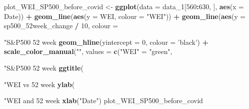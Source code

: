 \documentclass[]{article}
\newenvironment{Shaded}{\begin{snugshade}}{\end{snugshade}}
\newcommand{\KeywordTok}[1]{\textcolor[rgb]{0.13,0.29,0.53}{\textbf{#1}}}
\newcommand{\DataTypeTok}[1]{\textcolor[rgb]{0.13,0.29,0.53}{#1}}
\newcommand{\DecValTok}[1]{\textcolor[rgb]{0.00,0.00,0.81}{#1}}
\newcommand{\StringTok}[1]{\textcolor[rgb]{0.31,0.60,0.02}{#1}}
\newcommand{\OperatorTok}[1]{\textcolor[rgb]{0.81,0.36,0.00}{\textbf{#1}}}
\newcommand{\NormalTok}[1]{#1}
\begin{document}
\begin{Shaded}
\begin{Highlighting}[]
{{{{{{{{\NormalTok{plot_WEI_SP500_before_covid <-}\StringTok{ }\KeywordTok{ggplot}\NormalTok{(}\DataTypeTok{data =}\NormalTok{ data_}\DecValTok{1}\NormalTok{[}\DecValTok{560}\OperatorTok{:}\DecValTok{630}\NormalTok{, ], }\KeywordTok{aes}\NormalTok{(}\DataTypeTok{x =}\NormalTok{ Date)) }\OperatorTok{+}
\StringTok{  }\KeywordTok{geom_line}\NormalTok{(}\KeywordTok{aes}\NormalTok{(}\DataTypeTok{y =}\NormalTok{ WEI, }\DataTypeTok{colour =} \StringTok{"WEI"}\NormalTok{)) }\OperatorTok{+}\StringTok{ }
\StringTok{  }\KeywordTok{geom_line}\NormalTok{(}\KeywordTok{aes}\NormalTok{(}\DataTypeTok{y =}\NormalTok{ sp500_52week_change }\OperatorTok{/}\StringTok{ }\DecValTok{10}\NormalTok{, }\DataTypeTok{colour =} \StringTok{"S&P500 52 week %change"}\NormalTok{)) }\OperatorTok{+}
\StringTok{  }\KeywordTok{geom_hline}\NormalTok{(}\DataTypeTok{yintercept =} \DecValTok{0}\NormalTok{, }\DataTypeTok{colour =} \StringTok{'black'}\NormalTok{) }\OperatorTok{+}
\StringTok{  }\KeywordTok{scale_color_manual}\NormalTok{(}\StringTok{""}\NormalTok{, }\DataTypeTok{values =} \KeywordTok{c}\NormalTok{(}\StringTok{"WEI"}\NormalTok{ =}\StringTok{ "green"}\NormalTok{, }\StringTok{"S&P500 52 week %change"}\NormalTok{ =}\StringTok{ "blue"}\NormalTok{)) }\OperatorTok{+}\StringTok{ }
\StringTok{  }\KeywordTok{ggtitle}\NormalTok{(}\StringTok{"WEI vs 52 week % change of S&P500 before COVID-19"}\NormalTok{) }\OperatorTok{+}\StringTok{ }
\StringTok{  }\KeywordTok{ylab}\NormalTok{(}\StringTok{"WEI and 52 week % change S&P500"}\NormalTok{) }\OperatorTok{+}\StringTok{ }
\StringTok{  }\KeywordTok{xlab}\NormalTok{(}\StringTok{"Date"}\NormalTok{)}
\NormalTok{plot_WEI_SP500_before_covid}

}}}}}}}}}}}}
\end{Highlighting}
\end{Shaded}
\end{document}
